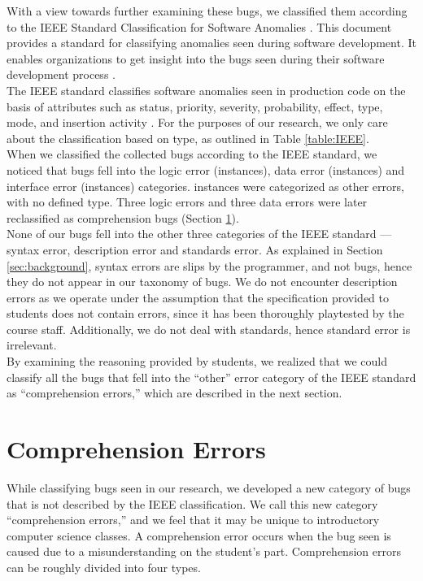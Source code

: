 \documentclass[11pt,letterpaper]{article}
\begin{document}
With a view towards further examining these bugs, we classified them according to the IEEE Standard Classification for Software Anomalies \cite{IEEE10}. This document provides a standard for classifying anomalies seen during software development. It enables organizations to get insight into the bugs seen during their software development process \cite{IEEE10}.\\

The IEEE standard classifies software anomalies seen in production code on the basis of attributes such as status, priority, severity, probability, effect, type, mode, and insertion activity \cite{IEEE10}. For the purposes of our research, we only care about the classification based on type, as outlined in Table \ref{table:IEEE}.\\


When we classified the collected bugs according to the IEEE standard, we noticed that bugs fell into the logic error (\numlogicIEEE instances), data error (\numdataIEEE instances) and interface error (\numinterfaceIEEE instances) categories. \numotherIEEE instances were categorized as other errors, with no defined type. Three logic errors and three data errors were later reclassified as comprehension bugs (Section \ref{sec:comprehension}).\\

None of our bugs fell into the other three categories of the IEEE standard --- syntax error, description error and standards error. As explained in Section \ref{sec:background}, syntax errors are slips by the programmer, and not bugs, hence they do not appear in our taxonomy of bugs. We do not encounter description errors as we operate under the assumption that the specification provided to students does not contain errors, since it has been thoroughly playtested by the course staff. Additionally, we do not deal with standards, hence standard error is irrelevant.\\

By examining the reasoning provided by students, we realized that we could classify all the bugs that fell into the ``other'' error category of the IEEE standard as ``comprehension errors,'' which are described in the next section.

\section{Comprehension Errors}
\label{sec:comprehension}

While classifying bugs seen in our research, we developed a new category of bugs that is not described by the IEEE classification. We call this new category ``comprehension errors,'' and we feel that it may be unique to introductory computer science classes. A comprehension error occurs when the bug seen is caused due to a misunderstanding on the student's part. Comprehension errors can be roughly divided into four types.
\vspace{0.06in}
\end{document}
